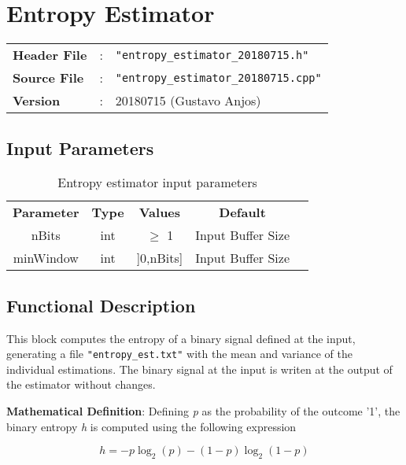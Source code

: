\section{Entropy Estimator}

\begin{tcolorbox}	
	\begin{tabular}{p{2.75cm} p{0.2cm} p{10.5cm}} 	
		\textbf{Header File}   &:& \texttt{"entropy\_estimator\_20180715.h"} \\
		\textbf{Source File}   &:& \texttt{"entropy\_estimator\_20180715.cpp"} \\
		\textbf{Version}       &:& 20180715 (Gustavo Anjos) \\
	\end{tabular}
\end{tcolorbox}


\subsection*{Input Parameters}

\begin{table}[h]
	\centering
	\begin{tabular}{|c|c|c|c|c|}
		\cline{1-4}
		\textbf{Parameter} & \textbf{Type} &\textbf{Values} &   \textbf{Default}& \\ \cline{1-4}
		nBits 	& int 	& $\geq$ 1 & Input Buffer Size \\ \cline{1-4}
		minWindow	 & int 	& ]0,nBits]  & Input Buffer Size \\ \cline{1-4} \cline{1-4}
	\end{tabular}
	\caption{Entropy estimator input parameters}
	\label{table:estimator_in_par}
\end{table}

\subsection*{Functional Description}
This block computes the entropy of a binary signal defined at the input, generating 
a file \texttt{"entropy\_est.txt"} with the mean and variance of the individual estimations.
The binary signal at the input is writen at the output of the estimator without changes.

\textbf{Mathematical Definition}: Defining \textit{p} as the probability of the 
outcome '1', the binary entropy \textit{h} is computed using the following expression

\begin{equation}
h = -p\log_2(p) - (1-p)\log_2(1-p)
\end{equation}  
   

